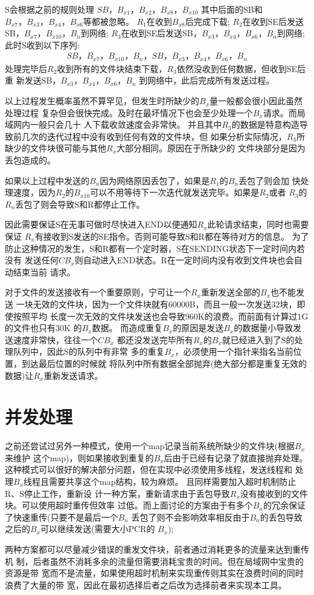 S会根据之前的规则处理
$SB，B_{x1}，B_{x2}，B_{x8}，B_{x10}$
其中后面的SB和$B_{x7}，B_{x3}，B_{x4}，B_{x6}$等都被忽略。
$R_1$在收到$B_{x8}$后完成下载;
$R_2$在收到SE后发送SB，$B_{x7}，B_{x10}，B_n$到网络;
$R_3$在收到SE后发送SB，$B_{x3}，B_{x4}，B_{x6}，B_n$到网络;\\
此时S收到以下序列:
\begin{align*}
	SB，B_{x7}，B_{x10}，B_n，SB，B_{x3}，B_{x4}，B_{x6}，B_n
\end{align*}
处理完毕后$R_2$收到所有的文件块结束下载，$R_3$依然没收到任何数据，但收到SE后重
新发送SB，$B_{x3}，B_{x4}，B_{x6}，B_n$ 到网络中，此后完成所有发送过程。

以上过程发生概率虽然不算罕见，但发生时所缺少的$B_x$量一般都会很小因此虽然处理过程
复杂但会很快完成。及时在最坏情况下也会至少处理一个$B_x$请求。而局域网内一般只会几十
人下载收敛速度会非常快。
并且其中$R_3$的数据是特意构造导致前几次的迭代过程中没有收到任何有效的文件块，但
如果分析实际情况，$R_3$所缺少的文件块很可能与其他$R_x$大部分相同。原因在于所缺少的
文件块部分是因为丢包造成的。

如果以上过程中发送的$B_n$因为网络原因丢包了，如果是$R_1$的$B_n$丢包了则会加
快处理速度，因为$R_2$的$B_{x10}$可以不用等待下一次迭代就发送完毕。如果是$R_2$或者
$R_3$的$R_n$丢包了则会导致S和R都停止工作。

因此需要保证S在无事可做时尽快进入END以便通知$R_x$此轮请求结束，同时也需要保证
$R_x$有接收到S发送的SE指令。否则可能导致S和R都在等待对方的信息。
为了防止这种情况的发生，S和R都有一个定时器，S在SENDING状态下一定时间内若没有
发送任何$CB_x$则自动进入END状态。R在一定时间内没有收到文件块也会自动结束当前
请求。

对于文件的发送接收有一个重要原则，宁可让一个$R_x$重新发送全部的$B_x$也不能发送
一块无效的文件块，因为一个文件块就有60000B，而且一般一次发送32块，即使按照平均
长度一次无效的文件块发送也会导致960K的浪费。而前面有计算过1G的文件也只有30K
的$B_x$数据。
而造成重复$B_x$的原因是发送$B_x$的数据量小导致发送速度非常快，往往一个$CB_x$
都还没发送完毕所有$R_x$的$B_x$就已经进入到了S的处理队列中，因此S的队列中有非常
多的重复$B_x$，必须使用一个指针来指名当前位置，到达最后位置的时候就
将队列中所有数据全部抛弃(绝大部分都是重复无效的数据)让$R_x$重新发送请求。

\section{并发处理}
之前还尝试过另外一种模式，使用一个map记录当前系统所缺少的文件块(根据$B_x$来维护
这个map)，则如果接收到重复的$B_x$后由于已经有记录了就直接抛弃处理。
这种模式可以很好的解决部分问题，但在实现中必须使用多线程，发送线程和
处理$B_x$线程且需要共享这个map结构，较为麻烦。
且同样需要加入超时机制防止R、S停止工作，重新设
计一种方案，重新请求由于丢包导致$R_x$没有接收到的文件块。可以使用超时重传但效率
过低。而上面讨论的方案由于有多个$B_n$的冗余保证了快速重传(只要不是最后一个$B_n$
丢包了则不会影响效率相反由于$B_n$的丢包导致之后的$B_x$可以继续发送(需要大小PCR的
$B_x$); 

两种方案都可以尽量减少错误的重发文件块，前者通过消耗更多的流量来达到重传机
制，后者虽然不消耗多余的流量但需要消耗宝贵的时间。但在局域网中宝贵的资源是带
宽而不是流量，如果使用超时机制来实现重传则其实在浪费时间的同时浪费了大量的带
宽，因此在最初选择后者之后改为选择前者来实现本工具。

